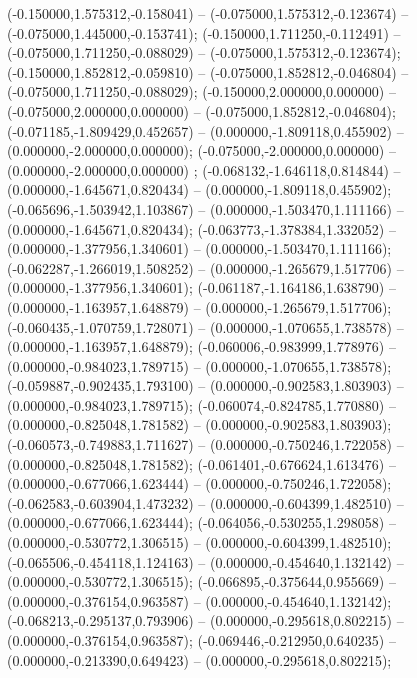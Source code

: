  (-0.150000,1.575312,-0.158041) -- (-0.075000,1.575312,-0.123674) -- (-0.075000,1.445000,-0.153741);
 (-0.150000,1.711250,-0.112491) -- (-0.075000,1.711250,-0.088029) -- (-0.075000,1.575312,-0.123674);
 (-0.150000,1.852812,-0.059810) -- (-0.075000,1.852812,-0.046804) -- (-0.075000,1.711250,-0.088029);
 (-0.150000,2.000000,0.000000) -- (-0.075000,2.000000,0.000000) -- (-0.075000,1.852812,-0.046804);
 (-0.071185,-1.809429,0.452657) -- (0.000000,-1.809118,0.455902) -- (0.000000,-2.000000,0.000000);
 (-0.075000,-2.000000,0.000000) -- (0.000000,-2.000000,0.000000) ;
 (-0.068132,-1.646118,0.814844) -- (0.000000,-1.645671,0.820434) -- (0.000000,-1.809118,0.455902);
 (-0.065696,-1.503942,1.103867) -- (0.000000,-1.503470,1.111166) -- (0.000000,-1.645671,0.820434);
 (-0.063773,-1.378384,1.332052) -- (0.000000,-1.377956,1.340601) -- (0.000000,-1.503470,1.111166);
 (-0.062287,-1.266019,1.508252) -- (0.000000,-1.265679,1.517706) -- (0.000000,-1.377956,1.340601);
 (-0.061187,-1.164186,1.638790) -- (0.000000,-1.163957,1.648879) -- (0.000000,-1.265679,1.517706);
 (-0.060435,-1.070759,1.728071) -- (0.000000,-1.070655,1.738578) -- (0.000000,-1.163957,1.648879);
 (-0.060006,-0.983999,1.778976) -- (0.000000,-0.984023,1.789715) -- (0.000000,-1.070655,1.738578);
 (-0.059887,-0.902435,1.793100) -- (0.000000,-0.902583,1.803903) -- (0.000000,-0.984023,1.789715);
 (-0.060074,-0.824785,1.770880) -- (0.000000,-0.825048,1.781582) -- (0.000000,-0.902583,1.803903);
 (-0.060573,-0.749883,1.711627) -- (0.000000,-0.750246,1.722058) -- (0.000000,-0.825048,1.781582);
 (-0.061401,-0.676624,1.613476) -- (0.000000,-0.677066,1.623444) -- (0.000000,-0.750246,1.722058);
 (-0.062583,-0.603904,1.473232) -- (0.000000,-0.604399,1.482510) -- (0.000000,-0.677066,1.623444);
 (-0.064056,-0.530255,1.298058) -- (0.000000,-0.530772,1.306515) -- (0.000000,-0.604399,1.482510);
 (-0.065506,-0.454118,1.124163) -- (0.000000,-0.454640,1.132142) -- (0.000000,-0.530772,1.306515);
 (-0.066895,-0.375644,0.955669) -- (0.000000,-0.376154,0.963587) -- (0.000000,-0.454640,1.132142);
 (-0.068213,-0.295137,0.793906) -- (0.000000,-0.295618,0.802215) -- (0.000000,-0.376154,0.963587);
 (-0.069446,-0.212950,0.640235) -- (0.000000,-0.213390,0.649423) -- (0.000000,-0.295618,0.802215);
